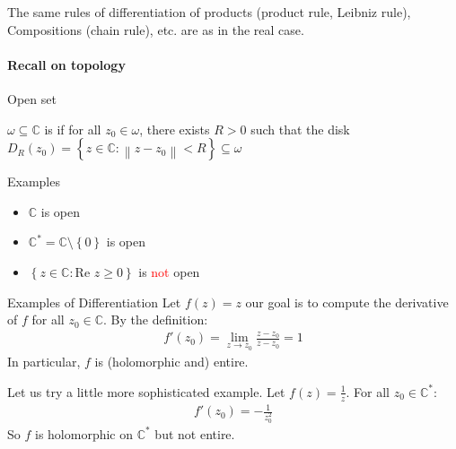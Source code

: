 \begin{framedremark}
The same rules of differentiation of products (product rule, Leibniz rule), Compositions (chain rule), etc. are as in the real case.
\end{framedremark}

\paragraph{Recall on topology}%
\label{par:Recall on topology}
\begin{parag}{Open set}
	\begin{definition}
	$\omega \subseteq \mathbb{C}$ is  if for all $z_0 \in \omega$, there exists $R > 0$ such that the disk $D_R\left(z_0\right) =  \left\{z \in \mathbb{C}: \left\|z - z_0\right\| < R\right\} \subseteq \omega$
	\end{definition}
    \begin{subparag}{Examples}
        \begin{itemize}
			\item $\mathbb{C}$ is open
			\item $\mathbb{C}^{\ast} =  \mathbb{C}\setminus \left\{0\right\}$ is open
			\item $\left\{z \in \mathbb{C} : \text{Re }z \geq 0\right\}$ is \textcolor{red}{not} open 
        \end{itemize}
    \end{subparag}
\end{parag}




\begin{parag}{Examples of Differentiation}
    Let $f\left(z\right) = z$ our goal is to compute the derivative of $f$ for all $z_0 \in \mathbb{C}$. By the definition:
	\begin{align*} 
		f'\left(z_0\right) =  \lim_{z \to z_0} \frac{z - z_0}{z - z_0} =  1
	\end{align*}
	In particular, $f$ is (holomorphic and) entire.

	Let us try a little more sophisticated example. Let $f\left(z\right) =  \frac{1}{z}$. For all $z_0 \in \mathbb{C}^{\ast}$:
	\begin{align*} 
		f'\left(z_0\right) = -\frac{1}{z_0^2}
	\end{align*}
	So $f$ is holomorphic on $\mathbb{C}^{\ast}$ but not entire.
\end{parag}































